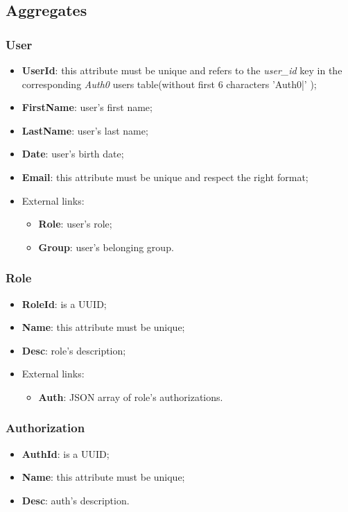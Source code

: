 \newpage
{}
\subsection{Aggregates}
\subsubsection{User}
\begin{itemize}
	\item \textbf{UserId}: this attribute must be unique and refers to the \emph{user\_id} key in the corresponding \emph{Auth0} users table(without first 6 characters 'Auth0|' );
	\item \textbf{FirstName}: user's first name;
	\item \textbf{LastName}: user's  last name;
	\item \textbf{Date}: user's birth date;
	\item \textbf{Email}: this attribute must be unique and respect the right format;
	\item External links:
	\begin{itemize}
		\item \textbf{Role}: user's role;
		\item \textbf{Group}: user's belonging group.
	\end{itemize}
\end{itemize}

\subsubsection{Role}
\begin{itemize}
	\item \textbf{RoleId}: is a UUID;
	\item \textbf{Name}: this attribute must be unique;
	\item \textbf{Desc}: role's description;
	\item External links:
	\begin{itemize}
		\item \textbf{Auth}: JSON array of role's authorizations.
	\end{itemize}
\end{itemize}

\subsubsection{Authorization}
\begin{itemize}
	\item \textbf{AuthId}: is a UUID;
	\item \textbf{Name}: this attribute must be unique;
	\item \textbf{Desc}: auth's description.
\end{itemize}

